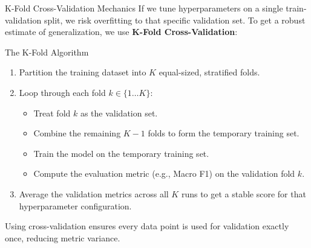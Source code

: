 \documentclass[9pt]{beamer}
\begin{document}
\begin{frame}{K-Fold Cross-Validation Mechanics}
  If we tune hyperparameters on a single train-validation split, we risk overfitting to that specific validation set. To get a robust estimate of generalization, we use \textbf{K-Fold Cross-Validation}:
  \begin{block}{The K-Fold Algorithm}
    \begin{enumerate}
      \item Partition the training dataset into $K$ equal-sized, stratified folds.
      \item Loop through each fold $k \in \{1 \dots K\}$:
        \begin{itemize}
          \item Treat fold $k$ as the validation set.
          \item Combine the remaining $K-1$ folds to form the temporary training set.
          \item Train the model on the temporary training set.
          \item Compute the evaluation metric (e.g., Macro F1) on the validation fold $k$.
        \end{itemize}
      \item Average the validation metrics across all $K$ runs to get a stable score for that hyperparameter configuration.
    \end{enumerate}
  \end{block}
  Using cross-validation ensures every data point is used for validation exactly once, reducing metric variance.
\end{frame}
\end{document}
